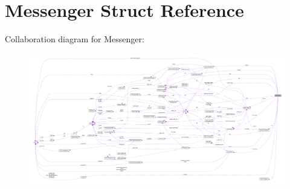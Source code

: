 \hypertarget{struct_messenger}{\section{Messenger Struct Reference}
\label{struct_messenger}
}


Collaboration diagram for Messenger\+:\nopagebreak
\begin{figure}[H]
\begin{center}
\leavevmode
\includegraphics[width=350pt]{struct_messenger__coll__graph}
\end{center}
\end{figure}
